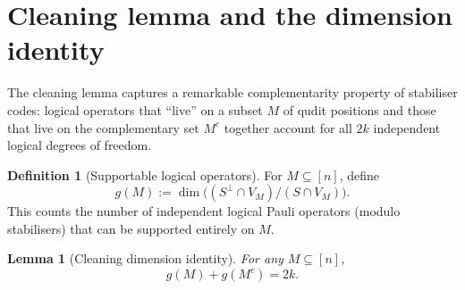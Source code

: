 \documentclass[11pt]{article}
\theoremstyle{plain}
\newtheorem{lemma}{Lemma}
\theoremstyle{definition}
\newtheorem{definition}{Definition}
\begin{document}
\section{Cleaning lemma and the dimension identity}\label{sec:cleaning}

The cleaning lemma captures a remarkable complementarity property of stabiliser codes: logical
operators that ``live'' on a subset $M$ of qudit positions and those that live on the
complementary set $M^c$ together account for all $2k$ independent logical degrees of freedom.

\begin{definition}[Supportable logical operators]
For $M \subseteq [n]$, define
\[
  g(M) := \dim\bigl( (S^\perp \cap V_M) / (S \cap V_M) \bigr).
\]
This counts the number of independent logical Pauli operators (modulo stabilisers) that can be
supported entirely on $M$.
\end{definition}

\begin{lemma}[Cleaning dimension identity]\label{lem:cleaning}
For any $M \subseteq [n]$,
\[
  g(M) + g(M^c) = 2k.
\]
\end{lemma}
\end{document}
